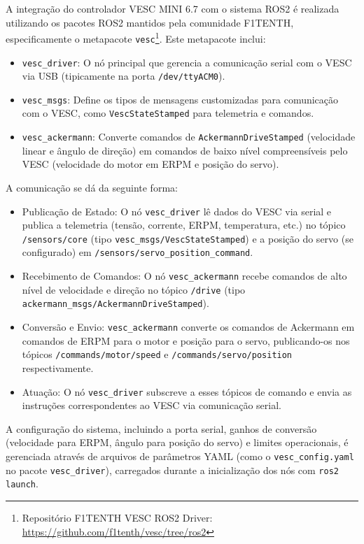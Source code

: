 A integração do controlador VESC MINI 6.7 com o sistema ROS2 é realizada
utilizando os pacotes ROS2 mantidos pela comunidade F1TENTH, especificamente o
metapacote \texttt{vesc}\footnote{Repositório F1TENTH VESC ROS2 Driver:
      \url{https://github.com/f1tenth/vesc/tree/ros2}}\cite{F1TENTHVESC}. Este
metapacote inclui:
\begin{itemize}
      \item \texttt{vesc\_driver}: O nó principal que gerencia a comunicação serial com o
            VESC via USB (tipicamente na porta \texttt{/dev/ttyACM0}).
      \item \texttt{vesc\_msgs}: Define os tipos de mensagens customizadas para
            comunicação com o VESC, como \texttt{VescStateStamped} para telemetria e
            comandos.
      \item \texttt{vesc\_ackermann}: Converte comandos de \texttt{AckermannDriveStamped} (velocidade
            linear e ângulo de direção) em comandos de baixo nível compreensíveis pelo
            VESC (velocidade do motor em ERPM e posição do servo).
\end{itemize}

A comunicação se dá da seguinte forma:
\begin{itemize}
      \item Publicação de Estado: O nó \texttt{vesc\_driver} lê dados do VESC via serial e
            publica a telemetria (tensão, corrente, ERPM, temperatura, etc.) no tópico
            \texttt{/sensors/core} (tipo \texttt{vesc\_msgs/VescStateStamped}) e a posição
            do servo (se configurado) em \texttt{/sensors/servo\_position\_command}.
      \item Recebimento de Comandos: O nó \texttt{vesc\_ackermann} recebe comandos de alto
            nível de velocidade e direção no tópico \texttt{/drive} (tipo
            \texttt{ackermann\_msgs/AckermannDriveStamped}).
      \item Conversão e Envio: \texttt{vesc\_ackermann} converte os comandos de Ackermann
            em comandos de ERPM para o motor e posição para o servo, publicando-os nos
            tópicos \texttt{/commands/motor/speed} e \texttt{/commands/servo/position}
            respectivamente.
      \item Atuação: O nó \texttt{vesc\_driver} subscreve a esses tópicos de comando e
            envia as instruções correspondentes ao VESC via comunicação serial.
\end{itemize}

A configuração do sistema, incluindo a porta serial, ganhos de conversão
(velocidade para ERPM, ângulo para posição do servo) e limites operacionais, é
gerenciada através de arquivos de parâmetros YAML (como o
\texttt{vesc\_config.yaml} no pacote \texttt{vesc\_driver}), carregados durante
a inicialização dos nós com \texttt{ros2 launch}.

